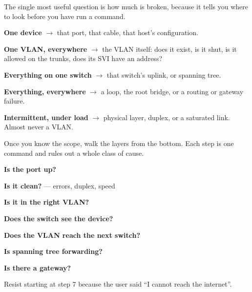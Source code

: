 \begin{conceptbox}
The single most useful question is how much is broken, because it tells you where
to look before you have run a command.

\begin{tight}
  \item \textbf{One device} $\rightarrow$ that port, that cable, that host's
        configuration.
  \item \textbf{One VLAN, everywhere} $\rightarrow$ the VLAN itself: does it
        exist, is it shut, is it allowed on the trunks, does its SVI have an
        address?
  \item \textbf{Everything on one switch} $\rightarrow$ that switch's uplink, or
        spanning tree.
  \item \textbf{Everything, everywhere} $\rightarrow$ a loop, the root bridge, or
        a routing or gateway failure.
  \item \textbf{Intermittent, under load} $\rightarrow$ physical layer, duplex, or
        a saturated link. Almost never a VLAN.
\end{tight}
\end{conceptbox}

\begin{conceptbox}
Once you know the scope, walk the layers from the bottom. Each step is one
command and rules out a whole class of cause.

\begin{tightnum}
  \item \textbf{Is the port up?} 
  \item \textbf{Is it clean?}  --- errors, duplex, speed
  \item \textbf{Is it in the right VLAN?} 
  \item \textbf{Does the switch see the device?} 
  \item \textbf{Does the VLAN reach the next switch?}
  \item \textbf{Is spanning tree forwarding?} 
  \item \textbf{Is there a gateway?} 
\end{tightnum}
Resist starting at step 7 because the user said ``I cannot reach the internet''.
\end{conceptbox}

